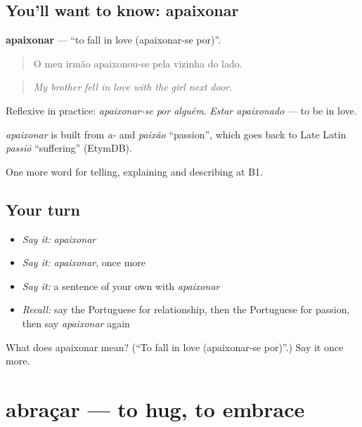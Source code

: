 \subsection*{You'll want to know: apaixonar}
\textbf{apaixonar} — \textquotedblleft{}to fall in love (apaixonar-se por)\textquotedblright{}.

\begin{quote}
O meu irmão apaixonou-se pela vizinha do lado.
\end{quote}

\begin{quote}
\emph{My brother fell in love with the girl next door.}
\end{quote}

Reflexive in practice: \emph{apaixonar-se por alguém}. \emph{Estar apaixonado} — to be in love.

\begin{cousinweb}
\emph{apaixonar} is built from \emph{a-} and \emph{paixão} \textquotedblleft{}passion\textquotedblright{}, which goes back to Late Latin \emph{passiō} \textquotedblleft{}suffering\textquotedblright{} (EtymDB).
\end{cousinweb}

\begin{grammarlens}[title={What you've built}]
One more word for telling, explaining and describing at B1.
\end{grammarlens}

\subsection*{Your turn}
\begin{itemize}
\raggedright
  \item \emph{Say it:} \emph{apaixonar}
  \item \emph{Say it:} \emph{apaixonar}, once more
  \item \emph{Say it:} a sentence of your own with \emph{apaixonar}
  \item \emph{Recall:} say the Portuguese for relationship, then the Portuguese for passion, then say \emph{apaixonar} again
\end{itemize}

\begin{tcolorbox}[breakable,colback=teal!4,colframe=teal!35!black,title={Before you move on}]
What does apaixonar mean? (\textquotedblleft{}To fall in love (apaixonar-se por)\textquotedblright{}.) Say it once more.
\end{tcolorbox}
\section[abraçar]{abraçar — to hug, to embrace}

